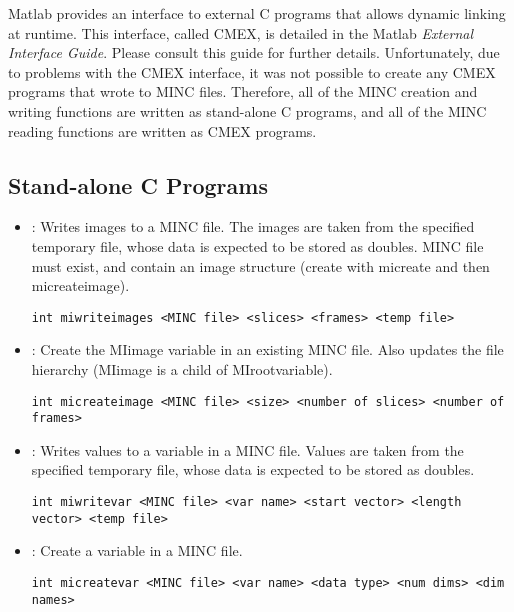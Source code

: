 Matlab provides an interface to external C programs that allows dynamic linking
at runtime.  This interface, called CMEX, is detailed in the Matlab
{\em External Interface Guide}.  Please consult this guide for further details.
Unfortunately, due to problems with the CMEX interface, it was not possible to
create any CMEX programs that wrote to MINC files.  Therefore, all of the
MINC creation and writing functions are written as stand-alone C programs, and
all of the MINC reading functions are written as CMEX programs.


\subsection {Stand-alone C Programs}

\begin {itemize}

\item {} : Writes images to a MINC file.  The images are taken from
    the specified temporary file, whose data is expected to
    be stored as doubles.  MINC file must exist, and contain
    an image structure (create with micreate and then
    micreateimage).
\begin{verbatim}
int miwriteimages <MINC file> <slices> <frames> <temp file>
\end{verbatim}

\item {} : Create the MIimage variable in an existing MINC file.
    Also updates the file hierarchy (MIimage is a child of MIrootvariable).
\begin{verbatim}
int micreateimage <MINC file> <size> <number of slices> <number of frames>
\end{verbatim}

\item {} : Writes values to a variable in a MINC file.  Values are
    taken from the specified temporary file, whose data is
    expected to be stored as doubles.
\begin{verbatim}
int miwritevar <MINC file> <var name> <start vector> <length vector> <temp file>
\end{verbatim}

\item {} : Create a variable in a MINC file.
\begin{verbatim}
int micreatevar <MINC file> <var name> <data type> <num dims> <dim names>
\end{verbatim}


\end{itemize}
